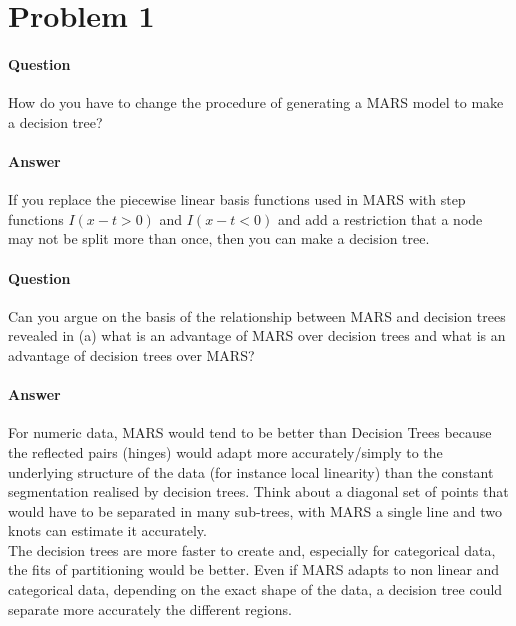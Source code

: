 \section*{Problem 1}

\paragraph{Question}How do you have to change the procedure of generating a MARS model to make a decision tree?

\paragraph{Answer} If you replace the piecewise linear basis functions used in MARS with step functions $I(x-t > 0)$ and $I(x-t < 0)$ and add a restriction that a node may not be split more than once, then you can make a decision tree. 

\paragraph{Question}Can you argue on the basis of the relationship between MARS and decision trees revealed in (a) what is an advantage of MARS over decision trees and what is an advantage of decision trees over MARS?
\\



\paragraph{Answer}For numeric data, MARS would tend to be better than Decision Trees because the reflected pairs (hinges) would adapt more accurately/simply to the underlying structure of the data (for instance local linearity) than the constant segmentation realised by decision trees. Think about a diagonal set of points that would have to be separated in many sub-trees, with MARS a single line and two knots can estimate it accurately. \\

\noindent The decision trees are more faster to create and, especially for categorical data, the fits of partitioning would be better. Even if MARS adapts to non linear and categorical data, depending on the exact shape of the data, a decision tree could separate more accurately the different regions.  





